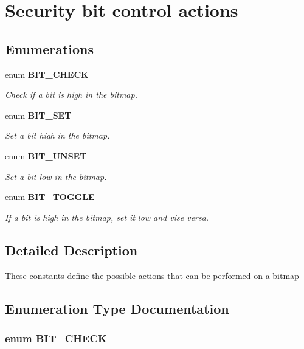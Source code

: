 \section{Security bit control actions}
\label{group__SECURITY__BitConrol}
\subsection*{Enumerations}
\begin{DoxyCompactItemize}
\item 
enum {\bf BIT\_\-CHECK} 
\begin{DoxyCompactList}\small\item\em Check if a bit is high in the bitmap. \end{DoxyCompactList}\item 
enum {\bf BIT\_\-SET} 
\begin{DoxyCompactList}\small\item\em Set a bit high in the bitmap. \end{DoxyCompactList}\item 
enum {\bf BIT\_\-UNSET} 
\begin{DoxyCompactList}\small\item\em Set a bit low in the bitmap. \end{DoxyCompactList}\item 
enum {\bf BIT\_\-TOGGLE} 
\begin{DoxyCompactList}\small\item\em If a bit is high in the bitmap, set it low and vise versa. \end{DoxyCompactList}\end{DoxyCompactItemize}


\subsection{Detailed Description}
These constants define the possible actions that can be performed on a bitmap 

\subsection{Enumeration Type Documentation}
\subsubsection[{BIT\_\-CHECK}]{\setlength{\rightskip}{0pt plus 5cm}enum {\bf BIT\_\-CHECK}}\label{group__SECURITY__BitConrol_ga21de8ac044d95cc6dc43980c9905439a}


